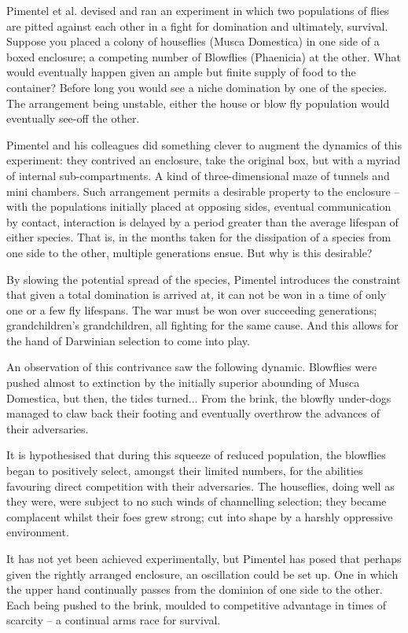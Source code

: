 Pimentel et al. devised and ran an experiment in which two populations of flies are pitted against each other in a fight for domination and ultimately, survival. \cite{pimentel1965selection}
\cite{hutchingson2018ecological} Suppose you placed a colony of houseflies (Musca Domestica) in one side of a boxed enclosure; a competing number of Blowflies (Phaenicia) at the other. What would eventually happen given an ample but finite supply of food to the container? Before long you would see a niche domination by one of the species. The arrangement being unstable, either the house or blow fly population would eventually see-off the other.\par
Pimentel and his colleagues did something clever to augment the dynamics of this experiment: they contrived an enclosure, take the original box, but with a myriad of internal sub-compartments. A kind of three-dimensional maze of tunnels and mini chambers. Such arrangement permits a desirable property to the enclosure -- with the populations initially placed at opposing sides, eventual communication by contact, interaction is delayed by a period greater than the average lifespan of either species. That is, in the months taken for the dissipation of a species from one side to the other, multiple generations ensue. But why is this desirable?\par
By slowing the potential spread of the species, Pimentel introduces the constraint that given a total domination is arrived at, it can not be won in a time of only one or a few fly lifespans. The war must be won over succeeding generations; grandchildren's grandchildren, all fighting for the same cause. And this allows for the hand of Darwinian selection to come into play.\par
An observation of this contrivance saw the following dynamic. Blowflies were pushed almost to extinction by the initially superior abounding of Musca Domestica, but then, the tides turned... From the brink, the blowfly under-dogs managed to claw back their footing and eventually overthrow the advances of their adversaries.\par
It is hypothesised that during this squeeze of reduced population, the blowflies began to positively select, amongst their limited numbers, for the abilities favouring direct competition with their adversaries. The houseflies, doing well as they were, were subject to no such winds of channelling selection; they became complacent whilst their foes grew strong; cut into shape by a harshly oppressive environment.\par
It has not yet been achieved experimentally, but Pimentel has posed that perhaps given the rightly arranged enclosure, an oscillation could be set up. One in which the upper hand continually passes from the dominion of one side to the other. Each being pushed to the brink, moulded to competitive advantage in times of scarcity -- a continual arms race for survival.\\

